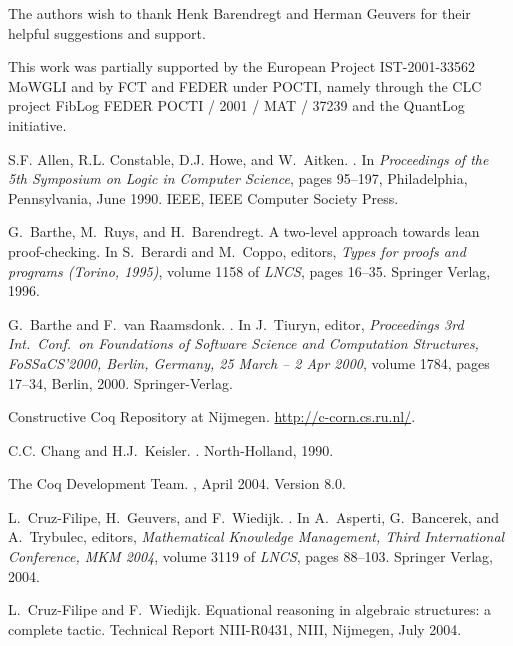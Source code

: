 \documentclass[numreferences]{kluwer}
\begin{document}
\begin{article}
\acknowledgements

The authors wish to thank Henk Barendregt and Herman Geuvers for their
helpful suggestions and support.

This work was partially supported by the European Project IST-2001-33562
MoWGLI and by FCT and FEDER under POCTI, namely through the CLC project FibLog
FEDER POCTI / 2001 / MAT / 37239 and the QuantLog initiative.

\begin{thebibliography}{99}
S.F. Allen, R.L. Constable, D.J. Howe, and W.~Aitken.
.
\newblock In {\em Proceedings of the 5th Symposium on Logic in Computer
  Science}, pages 95--197, Philadelphia, Pennsylvania, June 1990. IEEE, IEEE
  Computer Society Press.

G.~Barthe, M.~Ruys, and H.~Barendregt.
\newblock A two-level approach towards lean proof-checking.
\newblock In S.~Berardi and M.~Coppo, editors, {\em Types for proofs and
  programs (Torino, 1995)}, volume 1158 of {\em LNCS}, pages 16--35. Springer
  Verlag, 1996.

G.~Barthe and F.~van Raamsdonk.
.
\newblock In J.~Tiuryn, editor, {\em Proceedings 3rd Int.\ Conf.\ on
  Foundations of Software Science and Computation Structures, FoSSaCS'2000,
  Berlin, Germany, 25 March -- 2 Apr 2000}, volume 1784, pages 17--34, Berlin,
  2000. Springer-Verlag.

{Constructive Coq Repository at Nijmegen}.
\newblock \url{http://c-corn.cs.ru.nl/}.

C.C. Chang and H.J.~Keisler.
.
\newblock North-Holland, 1990.

The {C}oq Development Team.
, April 2004.
\newblock Version $8.0$.

L.~Cruz-Filipe, H.~Geuvers, and F.~Wiedijk.
.
\newblock In A.~Asperti, G.~Bancerek, and A.~Trybulec, editors,
  {\em Mathematical
  Knowledge Management, Third International Conference, MKM 2004},
  volume 3119 of {\em LNCS}, pages 88--103. Springer Verlag, 2004.

L.~Cruz-Filipe and F.~Wiedijk.
\newblock Equational reasoning in algebraic structures: a complete tactic.
\newblock Technical Report NIII-R0431, NIII, Nijmegen, July 2004.


\end{thebibliography}
\end{article}
\end{document}
